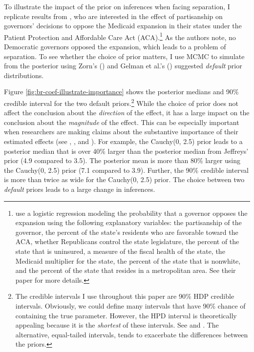 \documentclass[12pt]{article}
\begin{document}
To illustrate the impact of the prior on inferences when facing separation, I replicate results from \cite{BarrilleauxRainey2014}, who are interested in the effect of partisanship on governors' decisions to oppose the Medicaid expansion in their states under the Patient Protection and Affordable Care Act (ACA).\footnote{\cite{BarrilleauxRainey2014} use a logistic regression modeling the probability that a governor opposes the expansion using the following explanatory variables: the partisanship of the governor, the percent of the state's residents who are favorable toward the ACA, whether Republicans control the state legislature, the percent of the state that is uninsured, a measure of the fiscal health of the state, the Medicaid multiplier for the state, the percent of the state that is nonwhite, and the percent of the state that resides in a metropolitan area. See their paper for more details.} As the authors note, no Democratic governors opposed the expansion, which leads to a problem of separation. To see whether the choice of prior matters, I use MCMC to simulate from the posterior using Zorn's (\citeyear{Zorn2005}) and Gelman et al.'s (\citeyear{Gelmanetal2008}) suggested \emph{default} prior distributions. 

Figure \ref{fig:br-coef-illustrate-importance} shows the posterior medians and 90\% credible interval for the two default priors.\footnote{The credible intervals I use throughout this paper are 90\% HDP credible intervals. Obviously, we could define many intervals that have 90\% chance of containing the true parameter. However, the HPD interval is theoretically appealing because it is the \emph{shortest} of these intervals. See \citet[esp. pp. 48-51]{Gill2008} and \citet[esp. p. 448]{CasellaBerger2002}. The alternative, equal-tailed intervals, tends to exacerbate the differences between the priors.} While the choice of prior does not affect the conclusion about the \emph{direction} of the effect, it has a large impact on the conclusion about the \emph{magnitude} of the effect. This can be especially important when researchers are making claims about the substantive importance of their estimated effects (see \citealt{Rainey2014}, \citealt{Gross2014}, and \citealt{McCaskeyRainey2014}). For example, the Cauchy(0, 2.5) prior leads to a posterior median that is over 40\% larger than the posterior median from Jeffreys' prior (4.9 compared to 3.5). The posterior mean is more than 80\% larger using the Cauchy(0, 2.5) prior (7.1 compared to 3.9). Further, the 90\% credible interval is more than twice as wide for the Cauchy(0, 2.5) prior. The choice between two \emph{default} priors leads to a large change in inferences.
\end{document}

